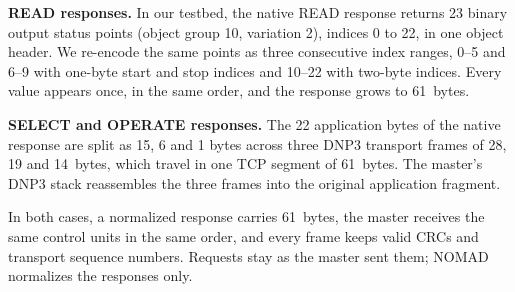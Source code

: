 \textbf{READ responses.} In our testbed, the native READ response returns 23 binary output status points (object group 10, variation 2), indices 0 to 22, in one object header. We re-encode the same points as three consecutive index ranges, 0--5 and 6--9 with one-byte start and stop indices and 10--22 with two-byte indices. Every value appears once, in the same order, and the response grows to 61~bytes.

\textbf{SELECT and OPERATE responses.} The 22 application bytes of the native response are split as 15, 6 and 1 bytes across three DNP3 transport frames of 28, 19 and 14~bytes, which travel in one TCP segment of 61~bytes. The master's DNP3 stack reassembles the three frames into the original application fragment.

In both cases, a normalized response carries 61~bytes, the master receives the same control units in the same order, and every frame keeps valid CRCs and transport sequence numbers. Requests stay as the master sent them; NOMAD normalizes the responses only.

